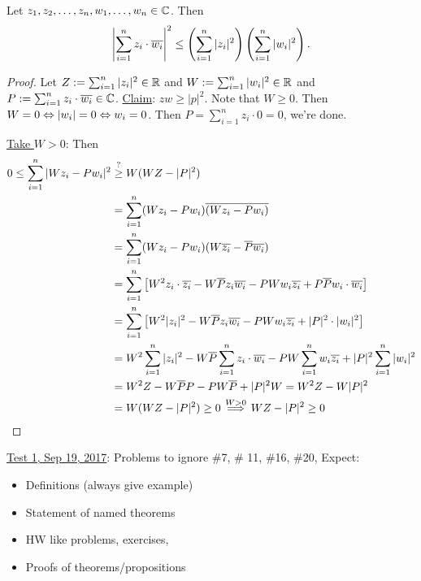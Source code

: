 \documentclass[]{article}
\begin{document}
\begin{theorem}
	 Let $z_1,z_2,\dots,z_n,w_1,\dots,w_n\in\mathbb{C}$. Then $$ \left| \sum_{i=1}^n z_i\cdot \overline{w_i} \right|^2 \leq \left(\sum_{i=1}^n |z_i|^2 \right) \left( \sum_{i=1}^n |w_i|^2\right).$$
\end{theorem}
\begin{proof}
	Let $Z:= \sum_{i=1}^n |z_i|^2 \in\mathbb{R}$ and $W: = \sum_{i=1}^n |w_i|^2\in\mathbb{R}$ and $P:=\sum_{i=1}^n z_i\cdot \overline{w_i}\in\mathbb{C}$. \ul{Claim}: $zw \geq |p|^2$. Note that $W \geq 0$. Then $W = 0 \Leftrightarrow |w_i| = 0 \Leftrightarrow w_i = 0$. Then $P = \sum_{i=1}^n z_i\cdot 0 = 0$, we're done.
	
	\ul{Take $W>0$}: Then 
	\begin{align*}
		0\leq \sum_{i=1}^n |Wz_i - Pw_i|^2 &\overset{?}{\geq} W(WZ-|P|^2) \\
		&= \sum_{i=1}^n(Wz_i-Pw_i)\overline{(Wz_i-Pw_i)} \\
		&= \sum_{i=1}^n(Wz_i-Pw_i)(W\overline{z_i}-\overline{P}\overline{w_i}) \\
		& = \sum_{i=1}^n \left[ W^2 z_i\cdot \overline{z_i} - W\overline{P} z_i \overline{w_i} - PW w_i \overline{z_i} + P\overline{P} w_i \cdot \overline{w_i} \right] \\
		&= \sum_{i=1}^n \left[ W^2|z_i|^2 - W\overline{P} z_i \overline{w_i} - PW w_i \overline{z_i} + |P|^2 \cdot |w_i|^2 \right] \\
		&= W^2 \sum_{i=1}^n |z_i|^2 - W\overline{P}\sum_{i=1}^n z_i \cdot \overline{w_i} - PW \sum_{i=1}^n w_i \overline{z_i} + |P|^2 \sum_{i=1}^n |w_i|^2 \\
		&= W^2 Z  - W\overline{P} P - P W \overline{P} + |P|^2 W = W^2Z - W|P|^2 \\
		&= W(WZ-|P|^2) \geq 0 \overset{W>0}{\implies} WZ-|P|^2 \geq 0
	\end{align*}
\end{proof}

\ul{Test 1, Sep 19, 2017}: Problems to ignore \#7, \# 11, \#16, \#20, Expect:
\begin{itemize}
	\item Definitions (always give example)
	\item Statement of named theorems
	\item HW like problems, exercises,
	\item Proofs of theorems/propositions
\end{itemize}
\end{document}
